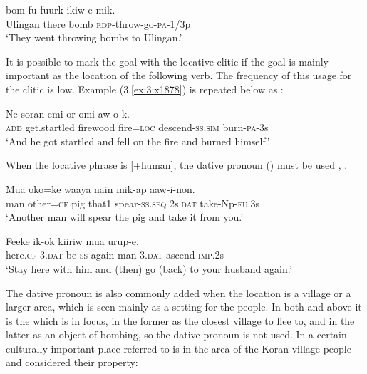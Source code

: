 \ea%
\label{ex:4:x863}
\gll {}   bom  fu-fuurk-ikiw-e-mik. \\
    Ulingan  there  bomb  \textsc{rdp}-throw-go-\textsc{pa}-1/3p  \\
\glt`They went throwing bombs to Ulingan.'
\z

It is possible to mark the goal with the locative clitic if the goal is mainly important as the location of the following verb. The frequency of this usage for the clitic is low. Example (3.\ref{ex:3:x1878}) is repeated below as : 

\ea%
\label{ex:4:x1884}
\gll Ne  soran-emi    or-omi  aw-o-k.
 \\
    \textsc{add}  get.startled  firewood  fire=\textsc{loc} descend-\textsc{ss}.\textsc{sim}  burn-\textsc{pa}-3s \\
\glt `And he got startled and fell on the fire and burned himself.'
\z

 

When the locative phrase is [+human], the dative pronoun () must be used , .

\ea%
\label{ex:4:x1061}
\gll Mua  oko=ke  waaya  nain  mik-ap   aaw-i-non. \\
     man  other=\textsc{cf}  pig  that1  spear-\textsc{ss}.\textsc{seq}  2s.\textsc{dat}  take-Np-\textsc{fu}.3s \\
\glt`Another man will spear the pig and take it from you.'
\z

\ea%
\label{ex:4:x1939}
\gll Feeke    ik-ok  kiiriw  mua    urup-e. \\
    here.\textsc{cf}  3.\textsc{dat}  be-\textsc{ss}  again  man  3.\textsc{dat}  ascend-\textsc{imp}.2s  \\
\glt`Stay here with him and (then) go (back) to your husband again.'
\z

The dative pronoun is also commonly added when the location is a village or a larger area, which is seen mainly as a setting for the people. In both  and  above it is the  which is in focus, in the former as the closest village to flee to, and in the latter as an object of bombing, so the dative pronoun is not used. In  a certain culturally important place referred to is in the area of the Koran village people and considered their property:

